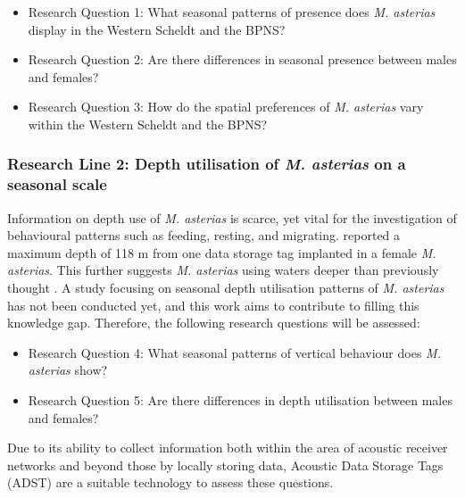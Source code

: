 \documentclass[
  authoryear,
  review,
  3p]{elsarticle}
\providecommand{\tightlist}{%
  \setlength{\itemsep}{0pt}\setlength{\parskip}{0pt}}\usepackage{longtable,booktabs,array}
\begin{document}
\begin{itemize}
\tightlist
\item
  Research Question 1: What seasonal patterns of presence does \emph{M.
  asterias} display in the Western Scheldt and the BPNS?
\item
  Research Question 2: Are there differences in seasonal presence
  between males and females?
\item
  Research Question 3: How do the spatial preferences of \emph{M.
  asterias} vary within the Western Scheldt and the BPNS?
\end{itemize}

\hypertarget{research-line-2-depth-utilisation-of-m.-asterias-on-a-seasonal-scale}{%
\subsubsection*{\texorpdfstring{Research Line 2: Depth utilisation of
\emph{M. asterias} on a seasonal
scale}{Research Line 2: Depth utilisation of M. asterias on a seasonal scale}}\label{research-line-2-depth-utilisation-of-m.-asterias-on-a-seasonal-scale}}

Information on depth use of \emph{M. asterias} is scarce, yet vital for
the investigation of behavioural patterns such as feeding, resting, and
migrating. \citet{griffiths_2020} reported a maximum depth of 118 m from
one data storage tag implanted in a female \emph{M. asterias}. This
further suggests \emph{M. asterias} using waters deeper than previously
thought \citep[depths \textless100 m,][]{ices_2019}. A study focusing on
seasonal depth utilisation patterns of \emph{M. asterias} has not been
conducted yet, and this work aims to contribute to filling this
knowledge gap. Therefore, the following research questions will be
assessed:

\begin{itemize}
\tightlist
\item
  Research Question 4: What seasonal patterns of vertical behaviour does
  \emph{M. asterias} show?
\item
  Research Question 5: Are there differences in depth utilisation
  between males and females?
\end{itemize}

Due to its ability to collect information both within the area of
acoustic receiver networks and beyond those by locally storing data,
Acoustic Data Storage Tags (ADST) are a suitable technology to assess
these questions.
\end{document}
